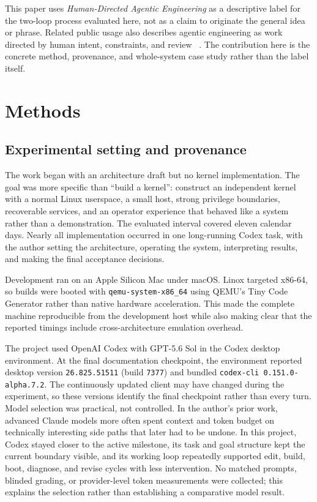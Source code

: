 \documentclass[11pt]{article}
\newcommand{\modelname}{OpenAI Codex with GPT-5.6 Sol}
\begin{document}
This paper uses \emph{Human-Directed Agentic Engineering} as a descriptive
label for the two-loop process evaluated here, not as a claim to originate the
general idea or phrase. Related public usage also describes agentic engineering
as work directed by human intent, constraints, and review
~\cite{niftHDAE2026,agentbubbleHDAE2026}. The contribution here is the concrete
method, provenance, and whole-system case study rather than the label itself.

\section{Methods}
\label{sec:methods}

\subsection{Experimental setting and provenance}

The work began with an architecture draft but no kernel implementation. The
goal was more specific than ``build a kernel'': construct an independent kernel
with a normal Linux userspace, a small host, strong privilege boundaries,
recoverable services, and an operator experience that behaved like a system
rather than a demonstration. The evaluated interval covered eleven calendar
days. Nearly all implementation occurred in one long-running Codex task, with
the author setting the architecture, operating the system, interpreting
results, and making the final acceptance decisions.

Development ran on an Apple Silicon Mac under macOS. Linox targeted x86-64, so
builds were booted with \texttt{qemu-system-x86\_64} using QEMU's Tiny Code
Generator rather than native hardware acceleration. This made the complete
machine reproducible from the development host while also making clear that the
reported timings include cross-architecture emulation overhead.

The project used \modelname{} in the Codex desktop environment. At the final
documentation checkpoint, the environment reported desktop version
\texttt{26.825.51511} (build \texttt{7377}) and bundled
\texttt{codex-cli 0.151.0-alpha.7.2}. The continuously updated client may have
changed during the experiment, so these versions identify the final checkpoint
rather than every turn. Model selection was practical, not controlled. In the
author's prior work, advanced Claude models more often spent context and token
budget on technically interesting side paths that later had to be undone. In
this project, Codex stayed closer to the active milestone, its task and goal
structure kept the current boundary visible, and its working loop repeatedly
supported edit, build, boot, diagnose, and revise cycles with less intervention.
No matched prompts, blinded grading, or provider-level token measurements were
collected; this explains the selection rather than establishing a comparative
model result.
\end{document}
